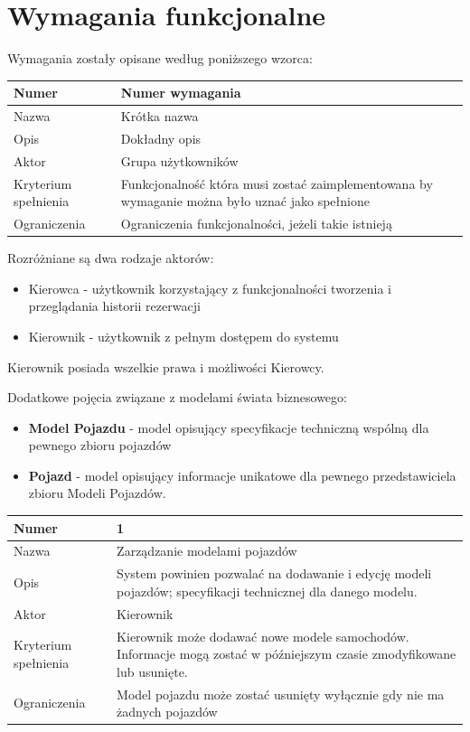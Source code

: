 \documentclass[eng,printmode,openany]{mgr}
\begin{document}
	\section{Wymagania funkcjonalne}
	Wymagania zostały opisane według poniższego wzorca:
	\begin{table}[H]
		\begin{tabularx}{\textwidth}{|l|X|}
			\hline
			Numer                & Numer wymagania \\ \hline
			Nazwa                & Krótka nazwa\\ \hline
			Opis                 & Dokładny opis\\ \hline
			Aktor                & Grupa użytkowników\\ \hline
			Kryterium spełnienia & Funkcjonalność która musi zostać zaimplementowana by wymaganie można było uznać jako spełnione\\ \hline
			Ograniczenia         & Ograniczenia funkcjonalności, jeżeli takie istnieją\\ \hline
		\end{tabularx}
	\end{table}
	Rozróżniane są dwa rodzaje aktorów:
	\begin{itemize}
		\item Kierowca - użytkownik korzystający z funkcjonalności tworzenia i przeglądania historii rezerwacji
		\item Kierownik - użytkownik z pełnym dostępem do systemu
	\end{itemize}
	Kierownik posiada wszelkie prawa i możliwości Kierowcy.
	
	Dodatkowe pojęcia związane z modelami świata biznesowego:
	\begin{itemize}
		\item \textbf{Model Pojazdu} - model opisujący specyfikacje techniczną wspólną dla pewnego zbioru pojazdów
		\item \textbf{Pojazd} - model opisujący informacje unikatowe dla pewnego przedstawiciela zbioru Modeli Pojazdów.
	\end{itemize}
	
	\begin{table}[H]
		\begin{tabularx}{\textwidth}{|l|X|}
			\hline
			Numer                & 1  \\ \hline
			Nazwa                & Zarządzanie modelami pojazdów \\ \hline
			Opis                 & System powinien pozwalać na dodawanie i edycję modeli pojazdów; specyfikacji technicznej dla danego modelu.    \\ \hline
			Aktor                & Kierownik \\ \hline
			Kryterium spełnienia & Kierownik może dodawać nowe modele samochodów. Informacje mogą zostać w późniejszym czasie zmodyfikowane lub usunięte.\\ \hline
			Ograniczenia         & Model pojazdu może zostać usunięty wyłącznie gdy nie ma żadnych pojazdów \\ \hline
		\end{tabularx}
	\end{table}
	
\end{document}
